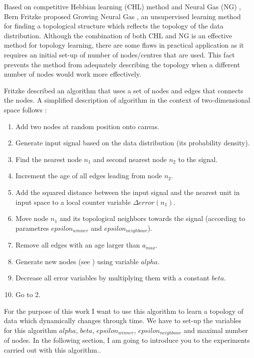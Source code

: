Based on competitive Hebbian learning (CHL) method \cite{Martinetz:chl} and Neural Gas (NG) \cite{Martinetz:ng}, Bern Fritzke proposed Growing Neural Gas \cite{Fritzke:gng}, an unsupervised learning method for finding a topological structure which reflects the topology of the data distribution. Although the combination of both CHL and NG is an effective method for topology learning, there are some flaws in practical application as it requires an initial set-up of number of nodes/centres that are used. This fact prevents the method from adequately describing the topology when a different number of nodes would work more effectively.

Fritzke described an algorithm that uses a set of nodes and edges that connects the nodes. A simplified description of algorithm in the context of two-dimensional space follows \cite{Fritzke:gng}:

\begin{enumerate}
\item Add two nodes at random position onto canvas.
\item Generate input signal based on the data distribution (its probability density).
\item Find the nearest node $n_1$ and second nearest node $n_2$ to the signal.
\item Increment the age of all edges leading from node $n_2$.
\item Add the squared distance between the input signal and the nearest unit in input space to a local counter variable $\Delta error(n_{1})$.
\item Move node $n_1$ and its topological neighbors towards the signal (according to parametres $epsilon_{winner}$ and $epsilon_{neighbour}$).
\item Remove all edges with an age larger than $a_{max}$.
\item Generate new nodes (see \cite{Fritzke:gng}) using variable $alpha$.
\item Decrease all error variables by multiplying them with a constant $beta$.
\item Go to 2.
\end{enumerate}

For the purpose of this work I want to use this algorithm to learn a topology of data which dynamically changes through time. We have to set-up the variables for this algorithm $alpha$, $beta$, $epsilon_{winner}$, $epsilon_{neighbour}$ and maximal number of nodes. In the following section, I am going to introduce you to the experiments carried out with this algorithm..

